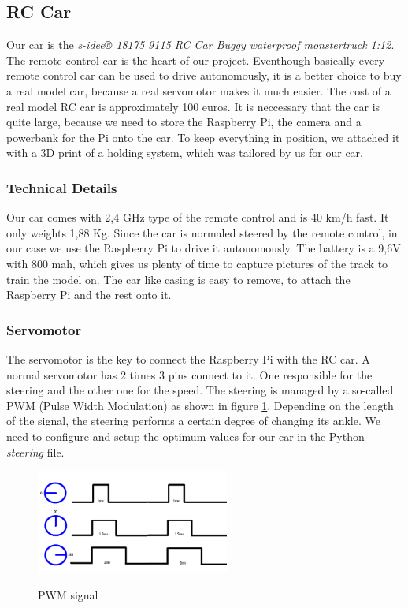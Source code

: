 \documentclass[journal]{IEEEtran}
\begin{document}
\subsection{RC Car}
Our car is the \textit{s-idee® 18175 9115 RC Car Buggy waterproof monstertruck 1:12}.
The remote control car is the heart of our project. Eventhough basically every remote control car can be used to drive autonomously, it is a better choice to buy a real model car, because a real servomotor makes it much easier. The cost of a real model RC car is approximately 100 euros. It is neccessary that the car is quite large, because we need to store the Raspberry Pi, the camera and a powerbank for the Pi onto the car. To keep everything in position, we attached it with a 3D print of a holding system, which was tailored by us for our car. \\

\subsubsection{Technical Details}
Our car comes with 2,4 GHz type of the remote control and is 40 km/h fast. It only weights 1,88 Kg. Since the car is normaled steered by the remote control, in our case we use the Raspberry Pi to drive it autonomously. The battery is a 9,6V with 800 mah, which gives us plenty of time to capture pictures of the track to train the model on. The car like casing is easy to remove, to attach the Raspberry Pi and the rest onto it.

\subsubsection{Servomotor}

The servomotor is the key to connect the Raspberry Pi with the RC car. A normal servomotor has 2 times 3 pins connect to it. One responsible for the steering and the other one for the speed. The steering is managed by a so-called PWM (Pulse Width Modulation) as shown in figure \ref{pwm}. Depending on the length of the signal, the steering performs a certain degree of changing its ankle. We need to configure and setup the optimum values for our car in the Python \textit{steering} file. \\

\begin{figure}
  \begin{center}
  \includegraphics[width=2.5in]{photo/pwm}\\
  \caption{PWM signal}\label{pwm}
  \end{center}
\end{figure}
\end{document}
